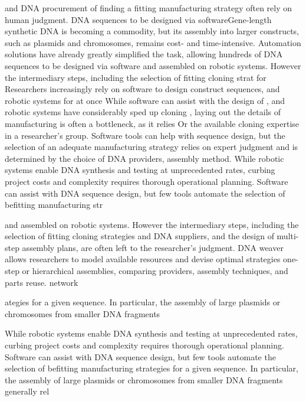 
and DNA procurement of finding a fitting manufacturing strategy often rely on human judgment. DNA sequences to be designed via softwareGene-length synthetic DNA is becoming a commodity, but its assembly into larger constructs, such as plasmids and chromosomes, remains cost- and time-intensive. Automation solutions have already greatly simplified the task, allowing hundreds of DNA sequences to be designed via software and assembled on robotic systems. However the intermediary steps, including the selection of fitting cloning strat for Researchers increasingly rely on software to design construct sequences, and robotic systems for at once While software can assist with the design of , and robotic systems have considerably sped up cloning , laying out the details of manufacturing is often a bottleneck, as it relies Or the available cloning expertise in a researcher's group. Software tools can help with sequence design, but the selection of an adequate manufacturing strategy relies on expert judgment and is determined by the choice of DNA providers, assembly method.
While robotic systems enable DNA synthesis and testing at unprecedented rates, curbing project costs and complexity requires thorough operational planning. Software can assist with DNA sequence design, but few tools automate the selection of befitting manufacturing str


 and assembled on robotic systems. However the intermediary steps, including the selection of fitting cloning strategies and DNA suppliers, and the design of multi-step assembly plans, are often left to the researcher's judgment.
DNA weaver allows researchers to model available resources and devise optimal strategies one-step or hierarchical assemblies, comparing providers, assembly techniques, and parts reuse. network

ategies for a given sequence. In particular, the assembly of large plasmids or chromosomes from smaller DNA fragments

While robotic systems enable DNA synthesis and testing at unprecedented rates, curbing project costs and complexity requires thorough operational planning. Software can assist with DNA sequence design, but few tools automate the selection of befitting manufacturing strategies for a given sequence. In particular, the assembly of large plasmids or chromosomes from smaller DNA fragments generally rel

